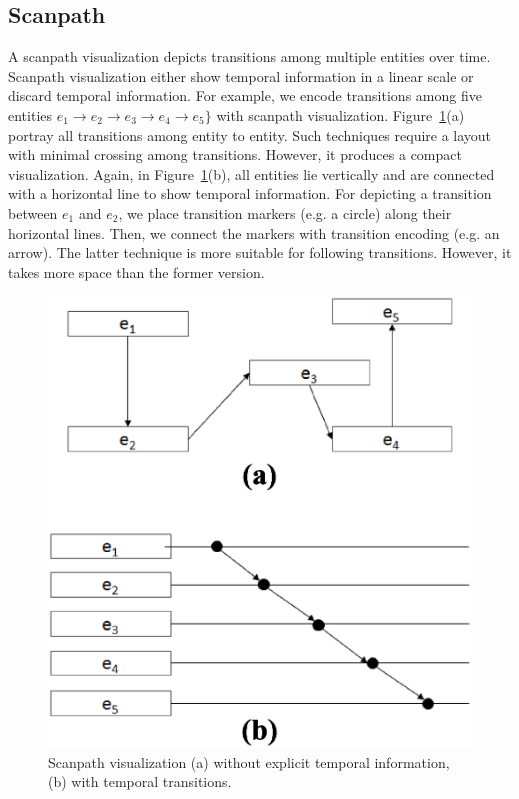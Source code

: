 \subsection{Scanpath}
A scanpath visualization depicts transitions among multiple entities over time. Scanpath visualization either show temporal information in a linear scale or discard temporal information. For example, we encode transitions among five entities $e_1 \rightarrow e_2\rightarrow e_3\rightarrow e_4\rightarrow e_5\}$ with scanpath visualization. Figure~\ref{fig:scanpathExample}(a) portray all transitions among entity to entity. Such techniques require a layout with minimal crossing among transitions. However, it produces a compact visualization. Again, in Figure~\ref{fig:scanpathExample}(b), all entities lie vertically and are connected with a horizontal line to show temporal information. For depicting a transition between $e_1$ and $e_2$, we place transition markers (e.g. a circle) along their horizontal lines. Then, we connect the markers with transition encoding (e.g. an arrow). The latter technique is more suitable for following transitions. However, it takes more space than the former version. 

\begin{figure}[htbp]
  \centering
  \includegraphics[width=\linewidth]{images/scanpathExample.eps}
  \caption{Scanpath visualization (a) without explicit temporal information, (b) with temporal transitions.}
	\label{fig:scanpathExample}
\end{figure}

